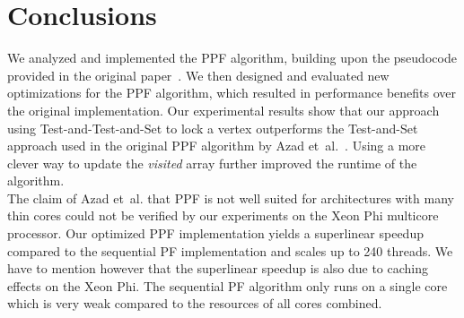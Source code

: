 \documentclass[letterpaper]{article}
\begin{document}
%

%

\section{Conclusions}

We analyzed and implemented the PPF algorithm, building upon the pseudocode provided in the original paper~\cite{Azad:2012}. We then designed and evaluated new optimizations for the PPF algorithm, which resulted in performance benefits over the original implementation. Our experimental results show that our approach using Test-and-Test-and-Set to lock a vertex outperforms the  Test-and-Set approach used in the original PPF algorithm by Azad et\ al.\ \cite{Azad:2012}. Using a more clever way to update the \textit{visited} array further improved the runtime of the algorithm.\\

The claim of Azad et\ al. \cite{Azad:2015} that PPF is not well suited for architectures with many thin cores could not be verified by our experiments on the Xeon Phi multicore processor. Our optimized PPF implementation yields a superlinear speedup compared to the sequential PF implementation and scales up to 240 threads. We have to mention however that the superlinear speedup is also due to caching effects on the Xeon Phi. The sequential PF algorithm only runs on a single core which is very weak compared to the resources of all cores combined.\\
\end{document}
